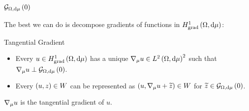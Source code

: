 \documentclass{beamer}
\begin{document}
\begin{frame}
	\frametitle{$\mathcal{G}_{ \Omega, \mathrm{d}\mu}\left( 0 \right)$}
	
	The best we can do is decompose gradients of functions in $H^1_\mathrm{grad}\left( \Omega, \mathrm{d}\mu \right)$:
	\begin{block}{Tangential Gradient}
		\begin{itemize}
			\item Every $u\in H^1_\mathrm{grad}\left( \Omega, \mathrm{d}\mu \right)$ has a unique $\nabla_{\mu}u\in L^{2}\left( \Omega,\mathrm{d}\mu \right)^2$ such that $\nabla_{\mu}u \perp \mathcal{G}_{ \Omega, \mathrm{d}\mu}\left( 0 \right)$.
			\item Every $\left( u,z \right)\in W$ can be represented as $\left( u,\nabla_{\mu}u + \widetilde{z} \right)\in W$ for $\widetilde{z}\in\mathcal{G}_{ \Omega, \mathrm{d}\mu}\left( 0 \right)$.	
		\end{itemize}
		$\nabla_{\mu}u$ is the tangential gradient of $u$.
	\end{block}	
	
\end{frame}
\end{document}
